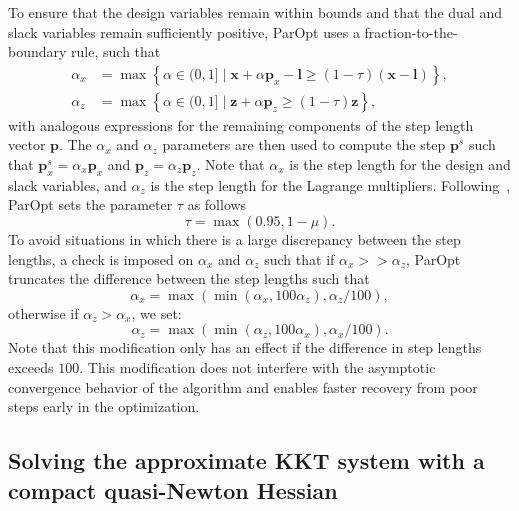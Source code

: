 \documentclass[12pt]{article}
\newcommand{\mb}{\mathbf}
\begin{document}
To ensure that the design variables remain within bounds and that the dual and slack variables remain sufficiently positive, ParOpt uses a fraction-to-the-boundary rule, such that
%
\begin{equation*}
  \begin{aligned}
    \alpha_{x} & = \max\left\{ \alpha \in (0, 1]\;|\; 
      \mb{x} + \alpha \mb{p}_{x} - \mb{l} \ge (1 - \tau)(\mb{x} - \mb{l}) \right\}, \\
      \alpha_{z} & = \max\left\{ \alpha \in (0, 1]\;|\; 
      \mb{z} + \alpha \mb{p}_{z} \ge (1 - \tau)\mb{z} \right\},
  \end{aligned}
\end{equation*}
%
with analogous expressions for the remaining components of the step length vector $\mb{p}$. 
The $\alpha_{x}$ and $\alpha_{z}$ parameters are then used to compute the step $\mb{p}^{s}$ such that $\mb{p}_{x}^{s} = \alpha_{x} \mb{p}_{x}$ and $\mb{p}_{z} = \alpha_{z}\mb{p}_{z}$.
Note that $\alpha_{x}$ is the step length for the design and slack variables, and $\alpha_{z}$ is the step length for the Lagrange multipliers. 
Following~\citet{Wachter:2006:IPOPT}, ParOpt sets the parameter $\tau$ as follows
%
\begin{equation*}
  \tau = \max(0.95, 1 - \mu).
\end{equation*}
To avoid situations in which there is a large discrepancy between the step lengths, a check is imposed on $\alpha_{x}$ and $\alpha_{z}$ such that if $\alpha_{x} >> \alpha_z$, ParOpt truncates the difference between the step lengths such that
%
\begin{equation*}
  \alpha_x = \max(\min(\alpha_x, 100\alpha_z), \alpha_z/100),
\end{equation*}
otherwise if $\alpha_z > \alpha_{x}$, we set:
\begin{equation*}
  \alpha_z = \max(\min(\alpha_z, 100\alpha_x), \alpha_x/100).
\end{equation*}
Note that this modification only has an effect if the difference in step lengths exceeds $100$. 
This modification does not interfere with the asymptotic convergence behavior of the algorithm and enables faster recovery from poor steps early in the optimization.

\subsection{Solving the approximate KKT system with a compact quasi-Newton Hessian}
\end{document}
